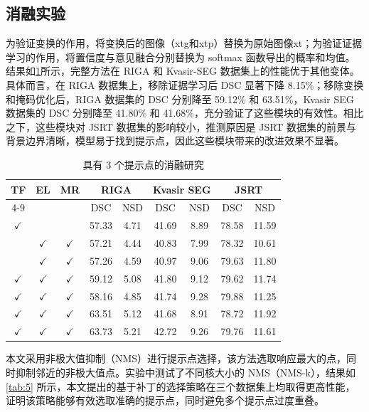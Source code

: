 \documentclass[12pt,a4paper]{article}
\begin{document}
	\subsection{消融实验}
	为验证变换的作用，将变换后的图像（xtg​和xtp​）替换为原始图像xt​；为验证证据学习的作用，将置信度与意见融合分别替换为 softmax 函数导出的概率和均值。结果如\cref{tab:4}所示，完整方法在 RIGA 和 Kvasir-SEG 数据集上的性能优于其他变体。具体而言，在 RIGA 数据集上，移除证据学习后 DSC 显著下降 8.15\%；移除变换和掩码优化后，RIGA 数据集的 DSC 分别降至 59.12\% 和 63.51\%，Kvasir SEG 数据集的 DSC 分别降至 41.80\% 和 41.68\%，充分验证了这些模块的有效性。相比之下，这些模块对 JSRT 数据集的影响较小，推测原因是 JSRT 数据集的前景与背景边界清晰，模型易于找到提示点，因此这些模块带来的改进效果不显著。
	\begin{table}[htbp]
		\centering
		\setlength{\tabcolsep}{6pt}
		\begin{tabular}{ccc|cc|cc|cc}
			\hline
			TF & EL & MR & \multicolumn{2}{c}{RIGA} & \multicolumn{2}{c}{Kvasir SEG} & \multicolumn{2}{c}{JSRT} \\
			\cline{4-9}
			& & & DSC & NSD & DSC & NSD & DSC & NSD \\
			\hline
			$\checkmark$ & & & 57.33 & 4.71 & 41.69 & 8.89 & 78.58 & 11.59 \\
			& $\checkmark$ & $\checkmark$ & 57.21 & 4.44 & 40.83 & 7.99 & 78.32 & 10.61 \\
			& $\checkmark$ & $\checkmark$ & 57.26 & 4.59 & 40.97 & 9.06 & 79.63 & 11.80 \\
			$\checkmark$ & $\checkmark$ & $\checkmark$ & 59.12 & 5.08 & 41.80 & 9.12 & 79.62 & 11.74 \\
			$\checkmark$ & $\checkmark$ & $\checkmark$ & 58.16 & 4.85 & 41.74 & 9.28 & 79.88 & 11.25 \\
			$\checkmark$ & $\checkmark$ & $\checkmark$ & 63.51 & 5.12 & 41.68 & 8.91 & 78.72 & 11.92 \\
			$\checkmark$ & $\checkmark$ & $\checkmark$ & 63.73 & 5.21 & 42.72 & 9.26 & 79.76 & 11.61 \\
			\hline
		\end{tabular}
		\caption{具有 3 个提示点的消融研究}
		\label{tab:4}
	\end{table}
	本文采用非极大值抑制（NMS）进行提示点选择，该方法选取响应最大的点，同时抑制邻近的非极大值点。实验中测试了不同核大小的 NMS（NMS-k），结果如\cref{tab:5} 所示，本文提出的基于补丁的选择策略在三个数据集上均取得更高性能，证明该策略能够有效选取准确的提示点，同时避免多个提示点过度重叠。
\end{document}
